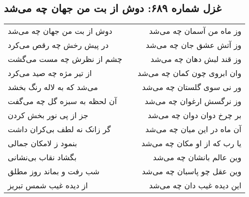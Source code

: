 \begin{center}
\section*{غزل شماره ۶۸۹: دوش از بت من جهان چه می‌شد}
\label{sec:0689}
\begin{longtable}{l p{0.5cm} r}
دوش از بت من جهان چه می‌شد
&&
وز ماه من آسمان چه می‌شد
\\
در پیش رخش چه رقص می‌کرد
&&
وز آتش عشق جان چه می‌شد
\\
چشم از نظرش چه مست می‌گشت
&&
وز قند لبش دهان چه می‌شد
\\
از تیر مژه چه صید می‌کرد
&&
وان ابروی چون کمان چه می‌شد
\\
می‌شد که به لاله رنگ بخشد
&&
ور نی سوی گلستان چه می‌شد
\\
آن لحظه به سبزه گل چه می‌گفت
&&
وز نرگسش ارغوان چه می‌شد
\\
جز از پی نور بخش کردن
&&
بر چرخ دوان دوان چه می‌شد
\\
گر زانک نه لطف بی‌کران داشت
&&
آن ماه در این میان چه می‌شد
\\
بنمود ز لامکان جمالی
&&
یا رب که از او مکان چه می‌شد
\\
بگشاد نقاب بی‌نشانی
&&
وین عالم بانشان چه می‌شد
\\
شب رفت و بماند روز مطلق
&&
وین عقل چو پاسبان چه می‌شد
\\
از دیده غیب شمس تبریز
&&
این دیده غیب دان چه می‌شد
\\
\end{longtable}
\end{center}
